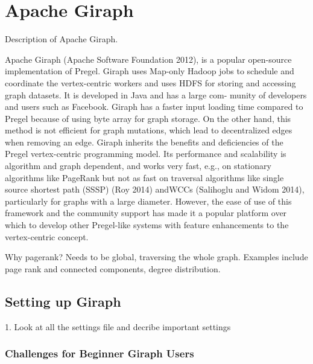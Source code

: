 \section{Apache Giraph}
\label{sec:giraph}

Description of Apache Giraph\cite{ApacheGiraph}.

Apache Giraph (Apache Software Foundation 2012), is a popular open-source implementation of
Pregel. Giraph uses Map-only Hadoop jobs to schedule and coordinate the 
vertex-centric workers and uses HDFS for storing and accessing graph datasets. 
It is developed in Java and has a large com- munity of developers and 
users such as Facebook\cite{GiraphAtFacebook}. 
Giraph has a faster input loading time compared to Pregel 
because of using byte array for graph storage. On the other hand, this method 
is not efficient for graph mutations, which lead to decentralized edges when removing an edge. 
Giraph inherits the benefits and deficiencies of the Pregel vertex-centric
programming model. Its performance and scalability is algorithm and graph dependent, 
and works very fast, e.g., on stationary algorithms like PageRank but not as fast on 
traversal algorithms like single source shortest path (SSSP) (Roy 2014) andWCCs 
(Salihoglu and Widom 2014), particularly for graphs with a large diameter. 
However, the ease of use of this framework and the community support has made it a 
popular platform over which to develop other Pregel-like systems with feature enhancements 
to the vertex-centric concept.


Why pagerank?
Needs to be global, traversing the whole graph. Examples include page rank and connected
components, degree distribution.

\subsection{Setting up Giraph}
1. Look at all the settings file and decribe important settings 


\subsubsection{Challenges for Beginner Giraph Users}

